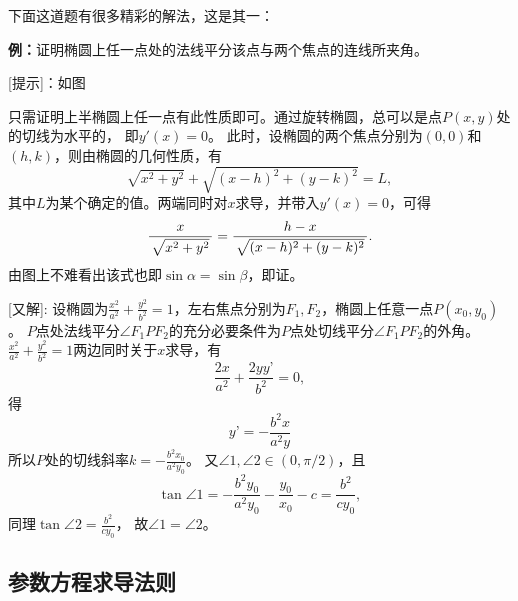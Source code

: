 \begin{shaded}
	下面这道题有很多精彩的解法，这是其一：
	
	{\bf 例：}证明椭圆上任一点处的法线平分该点与两个焦点的连线所夹角。

	[提示]：如图
	\begin{center}
	\end{center}
	只需证明上半椭圆上任一点有此性质即可。通过旋转椭圆，总可以是点$P(x,y)$处的切线为水平的，
	即$y'(x)=0$。
	此时，设椭圆的两个焦点分别为$(0,0)$和$(h,k)$，则由椭圆的几何性质，有
	$$\sqrt{x^2+y^2}+\sqrt{(x-h)^2+(y-k)^2}=L,$$
	其中$L$为某个确定的值。两端同时对$x$求导，并带入$y'(x)=0$，可得
	$$\displaystyle\frac{\,{x}\,}{\,{\sqrt{x^2+y^2}}\,}=\displaystyle\frac{\,{h-x}\,}{\,{\sqrt{(x-h)^2+(y-k)^2}}\,}.$$
	由图上不难看出该式也即$\sin\alpha=\sin\beta$，即证。
		
	[又解]:
	设椭圆为$\frac{x^2}{a^2}+\frac{y^2}{b^2}=1$，左右焦点分别为$F_1,F_2$，椭圆上任意一点$P(x_0,y_0)$。
	$P$点处法线平分$\angle F_1PF_2$的充分必要条件为$P$点处切线平分$\angle F_1PF_2$的外角。
	$\frac{x^2}{a^2}+\frac{y^2}{b^2}=1$两边同时关于$x$求导，有
	$$\frac{2x}{a^2}+\frac{2yy’}{b^2}=0,$$
	得
	$$y’=-\frac{b^2x}{a^2y}$$
	所以$P$处的切线斜率$k=-\frac{b^2x_0}{a^2y_0}$。
	又$\angle 1,\angle 2\in(0,\pi/2)$，且
	$$\tan\angle 1=-\frac{b^2y_0}{a^2y_0}-\frac{y_0}{x_0}-c=\frac{b^2}{cy_0},$$
	同理$\tan\angle 2= \frac{b^2}{cy_0}$，
	故$\angle 1=\angle 2$。

\end{shaded}

\subsection{参数方程求导法则}

